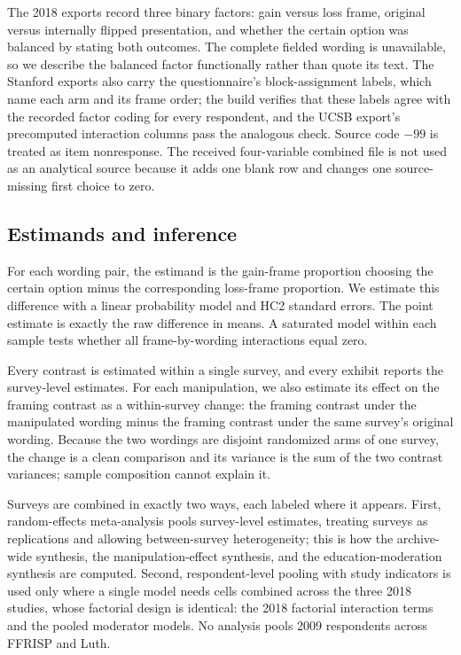 \documentclass[11pt]{article}
\begin{document}
The 2018 exports record three binary factors: gain versus loss frame, original versus internally flipped presentation, and whether the certain option was balanced by stating both outcomes. The complete fielded wording is unavailable, so we describe the balanced factor functionally rather than quote its text. The Stanford exports also carry the questionnaire's block-assignment labels, which name each arm and its frame order; the build verifies that these labels agree with the recorded factor coding for every respondent, and the UCSB export's precomputed interaction columns pass the analogous check. Source code $-99$ is treated as item nonresponse. The received four-variable combined file is not used as an analytical source because it adds one blank row and changes one source-missing first choice to zero.

\subsection{Estimands and inference}

For each wording pair, the estimand is the gain-frame proportion choosing the certain option minus the corresponding loss-frame proportion. We estimate this difference with a linear probability model and HC2 standard errors. The point estimate is exactly the raw difference in means. A saturated model within each sample tests whether all frame-by-wording interactions equal zero.

Every contrast is estimated within a single survey, and every exhibit reports the survey-level estimates. For each manipulation, we also estimate its effect on the framing contrast as a within-survey change: the framing contrast under the manipulated wording minus the framing contrast under the same survey's original wording. Because the two wordings are disjoint randomized arms of one survey, the change is a clean comparison and its variance is the sum of the two contrast variances; sample composition cannot explain it.

Surveys are combined in exactly two ways, each labeled where it appears. First, random-effects meta-analysis pools survey-level estimates, treating surveys as replications and allowing between-survey heterogeneity; this is how the archive-wide synthesis, the manipulation-effect synthesis, and the education-moderation synthesis are computed. Second, respondent-level pooling with study indicators is used only where a single model needs cells combined across the three 2018 studies, whose factorial design is identical: the 2018 factorial interaction terms and the pooled moderator models. No analysis pools 2009 respondents across FFRISP and Luth.
\end{document}
